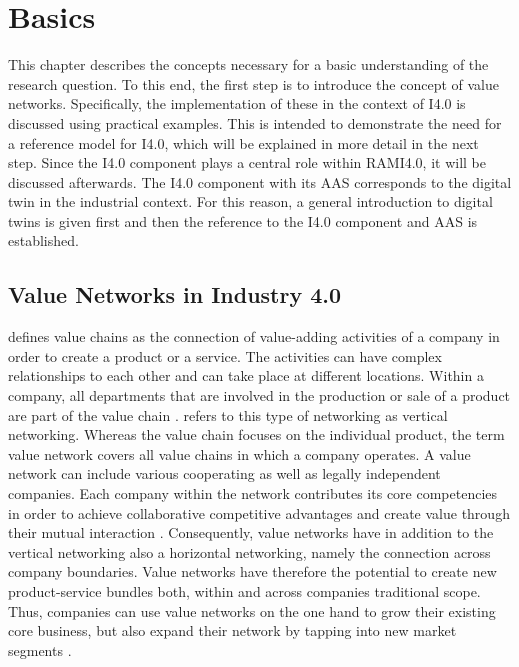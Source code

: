\chapter{Basics} \label{chap:basics}
This chapter describes the concepts necessary for a basic understanding of the research question. To this end, the first step is to introduce the concept of value networks. Specifically, the implementation of these in the context of \ac{I4.0} is discussed using practical examples. This is intended to demonstrate the need for a reference model for \ac{I4.0}, which will be explained in more detail in the next step. Since the \ac{I4.0} component plays a central role within \ac{RAMI4.0}, it will be discussed afterwards. The \ac{I4.0} component with its \ac{AAS} corresponds to the digital twin in the industrial context. For this reason, a general introduction to digital twins is given first and then the reference to the \ac{I4.0} component and \ac{AAS} is established.

\section{Value Networks in Industry 4.0} \label{sec:valuenetworks}
\citet[p. 6]{Sturgeon2001HowNetworks} defines value chains as the connection of value-adding activities of a company in order to create a product or a service. The activities can have complex relationships to each other and can take place at different locations. Within a company, all departments that are involved in the production or sale of a product are part of the value chain \cite[p. 10]{Sturgeon2001HowNetworks}. \citeauthor{Sturgeon2001HowNetworks} refers to this type of networking as vertical networking. Whereas the value chain focuses on the individual product, the term value network covers all value chains in which a company operates. A value network can include various cooperating as well as legally independent companies. Each company within the network contributes its core competencies in order to achieve collaborative competitive advantages and create value through their mutual interaction \cite[p. 3]{Bach2010GeschaftsmodelleGrundlagen}. Consequently, value networks have in addition to the vertical networking also a horizontal networking, namely the connection across company boundaries. Value networks have therefore the potential to create new product-service bundles both, within and across companies traditional scope. Thus, companies can use value networks on the one hand to grow their existing core business, but also expand their network by tapping into new market segments \cite[p. 22]{Acatech2013Recommendations4.0}.


